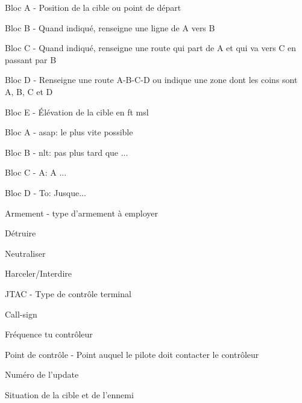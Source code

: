 \begin{e2}[0em]
\begin{e3}[0em]
		\item Bloc A - Position de la cible ou point de départ
		\item Bloc B - Quand indiqué, renseigne une ligne de A vers B
		\item Bloc C - Quand indiqué, renseigne une route qui part de A et qui va vers C en passant par B
		\item Bloc D - Renseigne une route A-B-C-D ou indique une zone dont les coins sont A, B, C et D
		\item Bloc E - Élévation de la cible en \gls{ft} \gls{msl}
	\end{e3}
	\begin{e3}[0em]
		\item Bloc A - \acrshort{asap}: le plus vite possible
		\item Bloc B - \acrshort{nlt}: pas plus tard que ...
		\item Bloc C - A: A ...
		\item Bloc D - To: Jusque...
	\end{e3}
	\begin{e3}[0em]
		\item Armement - type d'armement à employer
		\item Détruire
		\item Neutraliser
		\item Harceler/Interdire
	\end{e3}
	\begin{e3}[0em]
		\item JTAC - Type de contrôle terminal
		\item Call-sign
		\item Fréquence tu contrôleur
		\item Point de contrôle - Point auquel le pilote doit contacter le contrôleur
	\end{e3}
	\begin{e3}[0em]
		\item Numéro de l'update
		\item Situation de la cible et de l'ennemi

\end{e3}
\end{e2}
